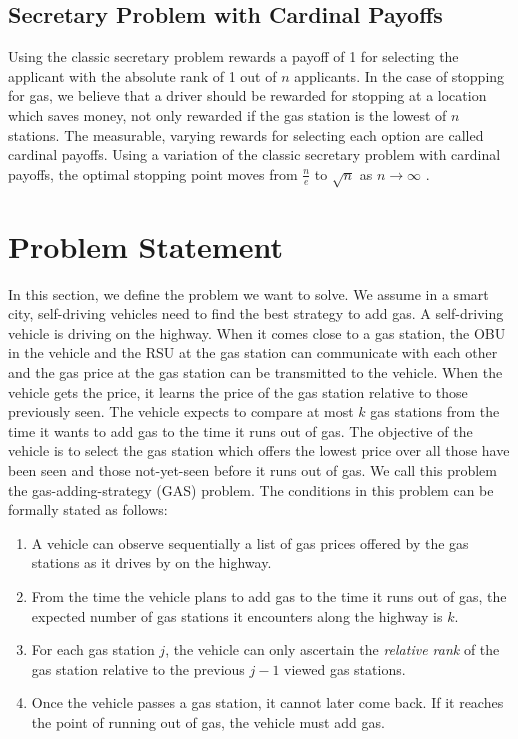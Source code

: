\documentclass[conference]{IEEEtran}
\theoremstyle{definition}
\begin{document}
\subsection{Secretary Problem with Cardinal Payoffs}
Using the classic secretary problem rewards a payoff of 1 for selecting the applicant with the absolute rank of 1 out of $n$ applicants. In the case of stopping for gas, we believe that a driver should be rewarded for stopping at a location which saves money, not only rewarded if the gas station is the lowest of $n$ stations. The measurable, varying rewards for selecting each option are called cardinal payoffs. Using a variation of the classic secretary problem with cardinal payoffs, the optimal stopping point moves from $\frac{n}{e}$ to $\sqrt{n}$ as $n \rightarrow \infty$ \cite{ferenstein:hal-00602313}.

\section{Problem Statement} \label{sec:problem}

In this section, we define the problem we want to solve. We assume in a smart city, self-driving vehicles need to find the best strategy to add gas. A self-driving vehicle is driving on the highway. When it comes close to a gas station, the OBU in the vehicle and the RSU at the gas station can communicate with each other and the gas price at the gas station can be transmitted to the vehicle. When the vehicle gets the price, it learns the price of the gas station relative to those previously seen. The vehicle expects to compare at most $k$ gas stations from the time it wants to add gas to the time it runs out of gas. The objective of the vehicle is to select the gas station which offers the lowest price over all those have been seen and those not-yet-seen before it runs out of gas. We call this problem the gas-adding-strategy (GAS) problem. The conditions in this problem can be formally stated as follows:

\begin{enumerate}
\item A vehicle can observe sequentially a list of gas prices offered by the gas stations as it drives by on the highway.
\item From the time the vehicle plans to add gas to the time it runs out of gas, the expected number of gas stations it encounters along the highway is $k$.
\item For each gas station $j$, the vehicle can only ascertain the {\em relative rank} of the gas station relative to the previous $j-1$ viewed gas stations.
\item Once the vehicle passes a gas station, it cannot later come back. If it reaches the point of running out of gas, the vehicle must add gas.
\end{enumerate}
\end{document}
